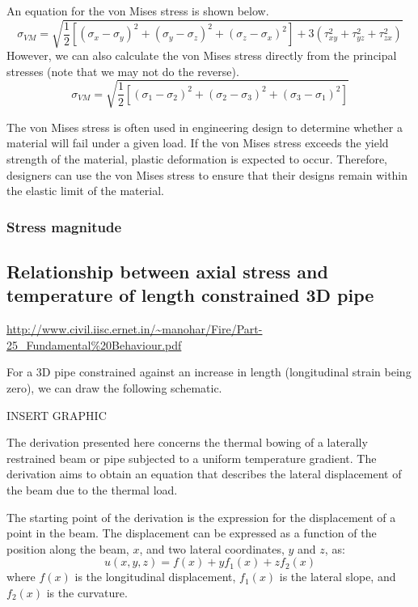 An equation for the von Mises stress is shown below.
\begin{equation}
    \sigma_{VM} = \sqrt{\frac{1}{2}\left[\left(\sigma_{x}-\sigma_y\right)^2 + \left(\sigma_y - \sigma_z\right)^2+\left(\sigma_z - \sigma_x\right)^2\right] + 3\left(\tau^2_{xy} + \tau^2_{yz}+\tau_{zx}^2\right)}
\end{equation}
However, we can also calculate the von Mises stress directly from the principal stresses (note that we may not do the reverse).
\begin{equation}
    \sigma_{VM} = \sqrt{\frac{1}{2}\left[\left(\sigma_1 - \sigma_2\right)^2 +\left(\sigma_2 - \sigma_3\right)^2 + \left(\sigma_3 - \sigma_1\right)^2 \right]}
\end{equation}

The von Mises stress is often used in engineering design to determine whether a material will fail under a given load. If the von Mises stress exceeds the yield strength of the material, plastic deformation is expected to occur. Therefore, designers can use the von Mises stress to ensure that their designs remain within the elastic limit of the material.
\subsubsection{Stress magnitude}
\subsection{Relationship between axial stress and temperature of length constrained 3D pipe}\label{part1b}
\url{http://www.civil.iisc.ernet.in/~manohar/Fire/Part-25_Fundamental%20Behaviour.pdf}

For a 3D pipe constrained against an increase in length (longitudinal strain being zero), we can draw the following schematic.

INSERT GRAPHIC

The derivation presented here concerns the thermal bowing of a laterally restrained beam or pipe subjected to a uniform temperature gradient. The derivation aims to obtain an equation that describes the lateral displacement of the beam due to the thermal load.

The starting point of the derivation is the expression for the displacement of a point in the beam. The displacement can be expressed as a function of the position along the beam, $x$, and two lateral coordinates, $y$ and $z$, as:
\begin{equation}
    u(x,y,z) = f(x) + yf_1(x) + zf_2(x)
\end{equation}
where $f(x)$ is the longitudinal displacement, $f_1(x)$ is the lateral slope, and $f_2(x)$ is the curvature.

